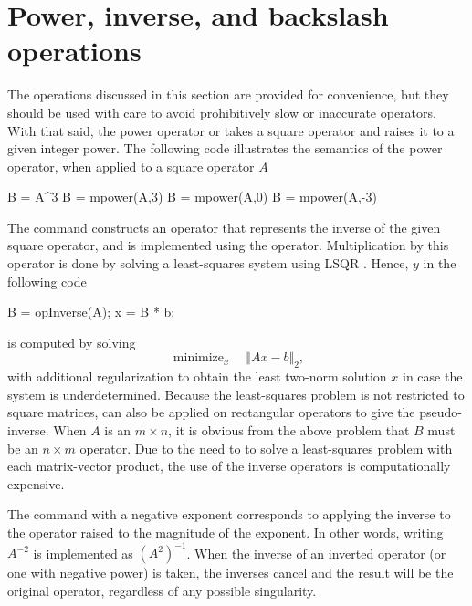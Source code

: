 \vspace*{1em}

\section{Power, inverse, and backslash operations}

The operations discussed in this section are provided for convenience,
but they should be used with care to avoid prohibitively slow or
inaccurate operators. With that said, the power operator \mlcmd{\^} or
 takes a square operator and raises it to a given
integer power. The following code illustrates the semantics of the
power operator, when applied to a square operator $A$
\begin{codeblock}
B = A^3            %
B = mpower(A,3)    %
B = mpower(A,0)    %
B = mpower(A,-3)   %
\end{codeblock}
The  command constructs an operator that represents the
inverse of the given square operator, and is implemented using the
 operator. Multiplication by this operator is done by
solving a least-squares system using LSQR \cite{PaigSaun:1982}. Hence,
$y$ in the following code
\begin{codeblock}
B = opInverse(A);
x = B * b;
\end{codeblock}
is computed by solving
\begin{equation}\label{Eq:LSQR}
\mathop{\mbox{minimize}}_{x}\quad \Vert Ax - b\Vert_2,
\end{equation}
with additional regularization to obtain the least two-norm solution
$x$ in case the system is underdetermined. Because the least-squares
problem is not restricted to square matrices,  can
also be applied on rectangular operators to give the
pseudo-inverse. When $A$ is an $m\times n$, it is obvious from the
above problem that $B$ must be an $n\times m$ operator.  Due to the
need to to solve a least-squares problem with each matrix-vector
product, the use of the inverse operators is computationally
expensive.

The  command with a negative exponent corresponds to
applying the inverse to the operator raised to the magnitude of the
exponent. In other words, writing $A^{-2}$ is implemented as
$(A^2)^{-1}$. When the inverse of an inverted operator (or one with
negative power) is taken, the inverses cancel and the result will be
the original operator, regardless of any possible singularity.

